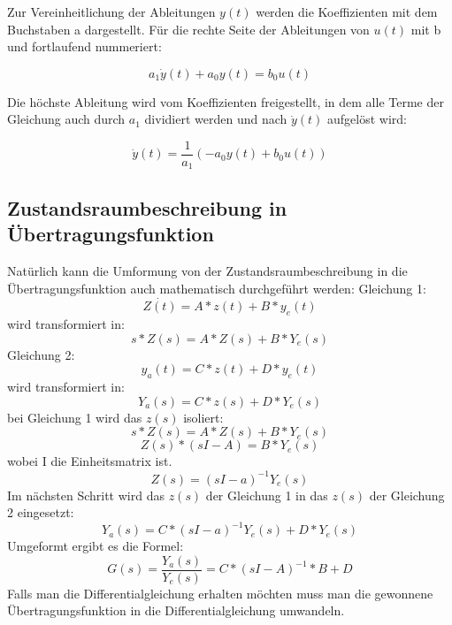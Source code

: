 \documentclass[
  ngerman
  ,12pt
  ,pdftex
]{article}
\begin{document}
Zur Vereinheitlichung der Ableitungen $y(t)$ werden die Koeffizienten mit dem Buchstaben a dargestellt.
Für die rechte Seite der Ableitungen von $u(t)$ mit b und fortlaufend nummeriert:

\begin{equation*}
  a_1\dot y(t)+a_0y(t) = b_0u(t)
\end{equation*}

Die höchste Ableitung wird vom Koeffizienten freigestellt, in dem alle Terme der Gleichung auch durch $a_1$ dividiert werden und nach $\dot y(t)$ aufgelöst wird:

\begin{equation*}
  \dot y(t)= \frac{1}{a_1}(-a_0y(t) +b_0u(t))
\end{equation*}
\subsection{Zustandsraumbeschreibung in Übertragungsfunktion}
Natürlich kann die Umformung von der Zustandsraumbeschreibung in die Übertragungsfunktion auch mathematisch durchgeführt werden:
Gleichung 1:
\begin{equation}
	\dot{Z(t)}=A*z(t)+B*y_{e}(t)
\end{equation}
wird transformiert in:
\begin{equation}
	s*Z(s)=A*Z(s)+B*Y_{e}(s)
\end{equation}
Gleichung 2:
\begin{equation}
	y_{a}(t)=C*z(t)+D*y_{e}(t)
\end{equation}
wird transformiert in:
\begin{equation}
	Y_{a}(s)=C*z(s)+D*Y_{e}(s)
\end{equation}
bei Gleichung 1 wird  das $z(s)$ isoliert:
\begin{equation}
	s*Z(s)=A*Z(s)+B*Y_{e}(s)
\end{equation}
\begin{equation}
	Z(s)*(sI-A)=B*Y_{e}(s)
\end{equation}
wobei I die Einheitsmatrix ist.
\begin{equation}
	Z(s)=(sI-a)^{-1}Y_{e}(s)
\end{equation}
Im nächsten Schritt wird das $z(s)$ der Gleichung 1 in das $z(s)$ der Gleichung 2 eingesetzt:
\begin{equation}
	Y_{a}(s)=C*(sI-a)^{-1}Y_{e}(s)+D*Y_{e}(s)
\end{equation}
Umgeformt ergibt es die Formel:
\begin{equation}
	G(s)=\frac{Y_{a}(s)}{Y_{e}(s)}=C*(sI-A)^{-1}*B+D
\end{equation}
Falls man die Differentialgleichung erhalten möchten muss man die gewonnene Übertragungsfunktion in die Differentialgleichung umwandeln.
\end{document}
